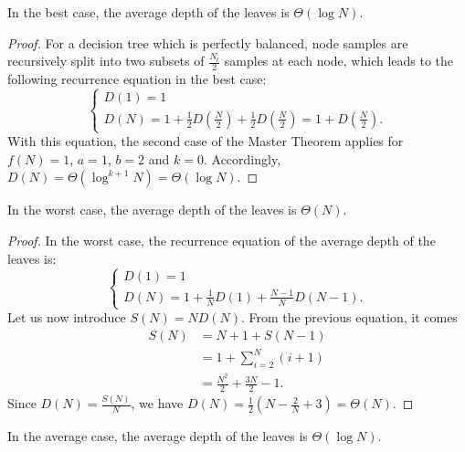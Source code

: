 \begin{theorem}\label{thm:6:best:depth}
In the best case, the average depth of the leaves is $\Theta(\log N)$.
\end{theorem}

\begin{proof}
For a decision tree which is perfectly balanced, node samples are recursively split
into two subsets of $\tfrac{N_t}{2}$ samples at each node, which leads to the following
recurrence equation in the best case:
\begin{equation}
\begin{cases}
D(1) = 1 \\
D(N) = 1 + \frac{1}{2} D(\frac{N}{2}) + \frac{1}{2} D(\frac{N}{2}) = 1+D(\frac{N}{2}).
\end{cases}
\end{equation}
With this equation, the second case of the Master Theorem applies for $f(N) = 1$, $a=1$, $b=2$ and $k=0$.
Accordingly, $D(N)=\Theta(\log^{k+1} N) = \Theta(\log N)$.
\end{proof}

\begin{theorem}\label{thm:6:worst:depth}
In the worst case, the average depth of the leaves is $\Theta(N)$.
\end{theorem}

\begin{proof}
In the worst case, the recurrence equation of the average depth of the leaves is:
\begin{equation}
\begin{cases}
D(1) = 1 \\
D(N) = 1 + \frac{1}{N} D(1) + \frac{N-1}{N} D(N-1).
\end{cases}
\end{equation}
Let us now introduce $S(N)=N D(N)$. From the previous equation, it comes
\begin{align}
S(N) &= N+1 + S(N-1) \nonumber \\
     &= 1+ \sum_{i=2}^N (i + 1) \nonumber \\
     &= \frac{N^2}{2} + \frac{3N}{2} - 1.
\end{align}
Since $D(N) = \tfrac{S(N)}{N}$, we have $D(N) = \frac{1}{2} (N - \frac{2}{N} + 3) = \Theta(N)$.
\end{proof}

\begin{theorem}\label{thm:6:average:depth}
In the average case, the average depth of the leaves is $\Theta(\log N)$.
\end{theorem}

